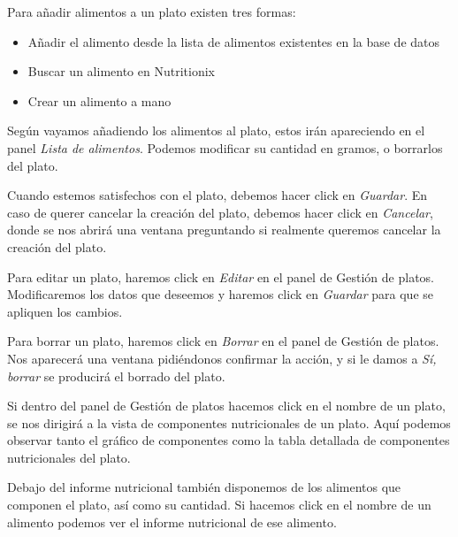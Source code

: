 Para añadir alimentos a un plato existen tres formas:

\begin{itemize}
	\item Añadir el alimento desde la lista de alimentos existentes en la base de datos
	\item Buscar un alimento en Nutritionix
	\item Crear un alimento a mano	
\end{itemize}

Según vayamos añadiendo los alimentos al plato, estos irán apareciendo en el panel \textit{Lista de alimentos}. Podemos modificar su cantidad en gramos, o borrarlos del plato.

Cuando estemos satisfechos con el plato, debemos hacer click en \textit{Guardar}. En caso de querer cancelar la creación del plato, debemos hacer click en \textit{Cancelar}, donde se nos abrirá una ventana preguntando si realmente queremos cancelar la creación del plato.





Para editar un plato, haremos click en \textit{Editar} en el panel de Gestión de platos. Modificaremos los datos que deseemos y haremos click en \textit{Guardar} para que se apliquen los cambios.


Para borrar un plato, haremos click en \textit{Borrar} en el panel de Gestión de platos. Nos aparecerá una ventana pidiéndonos confirmar la acción, y si le damos a \textit{Sí, borrar} se producirá el borrado del plato.


Si dentro del panel de Gestión de platos hacemos click en el nombre de un plato, se nos dirigirá a la vista de componentes nutricionales de un plato. Aquí podemos observar tanto el gráfico de componentes como la tabla detallada de componentes nutricionales del plato.

Debajo del informe nutricional también disponemos de los alimentos que componen el plato, así como su cantidad. Si hacemos click en el nombre de un alimento podemos ver el informe nutricional de ese alimento.

